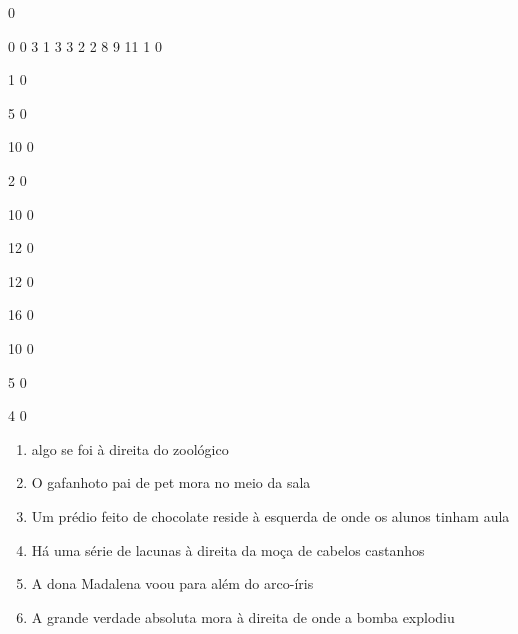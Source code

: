 \documentclass[12pt]{article}
\begin{document}
		\vfill  
		  
{
	0	%

	0	%
	0	%
	3	%
	1	%
	3	%
	3	%
	2	%
	2	%
	8	%
	9	%
	11	%
	1	%
	0	%

	1	%
	0	%

	5	%
	0	%

	10	%
	0	%

	2	%
	0	%

	10	%
	0	%

	12	%
	0	%

	12	%
	0	%

	16	%
	0	%

	10	%
	0	%

	5	%
	0	%

	4	%
	0	%

}	  
		    	

		 

\pagebreak


	\begin{enumerate}
		  \sffamily %
		  \large %


\vfill \item
algo se foi	%
à direita
do zoológico	%

\vfill \item
O gafanhoto pai de pet mora	%
no meio da sala	%

\vfill \item
Um prédio feito de chocolate reside	%
à esquerda
de onde os alunos tinham aula	%

\vfill \item
Há uma série de lacunas	%
à direita
da moça de cabelos castanhos	%

\vfill \item
A dona Madalena	%
voou para além do arco-íris	%

\vfill \item
A grande verdade absoluta mora	%
à direita
de onde a bomba explodiu	%
	\end{enumerate}
		  
		  \hfill

		  \vfill
\end{document}
